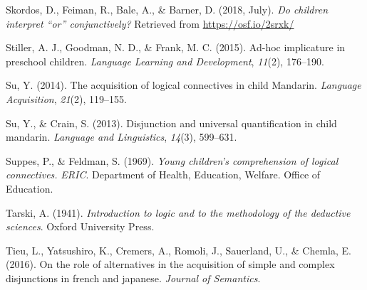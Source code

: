 \documentclass[floatsintext,man]{apa6}
\theoremstyle{definition}
\theoremstyle{definition}
\theoremstyle{definition}
\theoremstyle{remark}
\begin{document}
\hypertarget{ref-skordosEtal2018}{}
Skordos, D., Feiman, R., Bale, A., \& Barner, D. (2018, July). \emph{Do
children interpret ``or'' conjunctively?} Retrieved from
\url{https://osf.io/2srxk/}

\hypertarget{ref-stiller2015ad}{}
Stiller, A. J., Goodman, N. D., \& Frank, M. C. (2015). Ad-hoc
implicature in preschool children. \emph{Language Learning and
Development}, \emph{11}(2), 176--190.

\hypertarget{ref-su2014acquisition}{}
Su, Y. (2014). The acquisition of logical connectives in child Mandarin.
\emph{Language Acquisition}, \emph{21}(2), 119--155.

\hypertarget{ref-su2013disjunction}{}
Su, Y., \& Crain, S. (2013). Disjunction and universal quantification in
child mandarin. \emph{Language and Linguistics}, \emph{14}(3), 599--631.

\hypertarget{ref-suppes1969young}{}
Suppes, P., \& Feldman, S. (1969). \emph{Young children's comprehension
of logical connectives.} \emph{ERIC}. Department of Health, Education,
Welfare. Office of Education.

\hypertarget{ref-tarski1941logic}{}
Tarski, A. (1941). \emph{Introduction to logic and to the methodology of
the deductive sciences}. Oxford University Press.

\hypertarget{ref-tieu2016}{}
Tieu, L., Yatsushiro, K., Cremers, A., Romoli, J., Sauerland, U., \&
Chemla, E. (2016). On the role of alternatives in the acquisition of
simple and complex disjunctions in french and japanese. \emph{Journal of
Semantics}.
\end{document}
